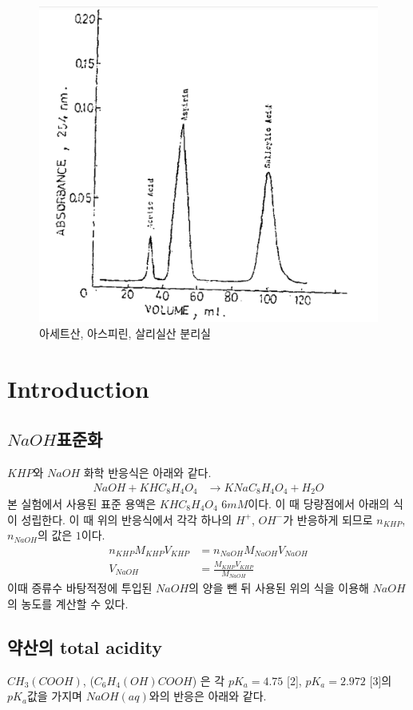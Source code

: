 \documentclass[%
 reprint,
 amsmath,amssymb,
 aps,
]{revtex4-2}
\begin{document}
\begin{figure}[htbp]
	\includegraphics[width = 0.9\linewidth]{EXP_P.png}%
	\caption{\label{fig:EXP_P}아세트산, 아스피린, 살리실산 분리실}
\end{figure}

\section{\label{sec:level1}Introduction}
\subsection{\label{sec:level2}$NaOH$표준화}
$KHP$와 $NaOH$ 화학 반응식은 아래와 같다.
\begin{align}
	NaOH + KHC_{8}H_{4}O_{4} &\rightarrow KNaC_{8}H_{4}O_{4} + H_{2}O
\end{align}
본 실험에서 사용된 표준 용액은 $KHC_{8}H_{4}O_{4}$ $6mM$이다. 이 때 당량점에서 아래의 식이 성립한다. 이 때 위의 반응식에서 각각 하나의 $H^{+}$, $OH^{-}$가 반응하게 되므로 $n_{KHP}$, $n_{NaOH}$의 값은 $1$이다.
\begin{align}
	n_{KHP}M_{KHP}V_{KHP} &= n_{NaOH}M_{NaOH}V_{NaOH}\\
	V_{NaOH} &= \frac{M_{KHP}V_{KHP}}{M_{NaOH}}
\end{align}
이때 증류수 바탕적정에 투입된 $NaOH$의 양을 뺀 뒤 사용된 위의 식을 이용해 $NaOH$의 농도를 계산할 수 있다.


\subsection{\label{sec:level2}약산의 total acidity}
$CH_{3}(COOH)$, ($C_{6}H_{4}(OH)COOH$) 은 각 $pK_{a}=4.75$ [2], $pK_{a}=2.972$ [3]의 $pK_{a}$값을 가지며 $NaOH(aq)$와의 반응은 아래와 같다.
\end{document}
